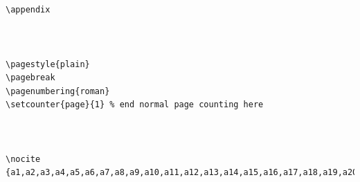 \documentclass[12pt]{report}
\begin{document}
\begin{verbatim}
	

\appendix

	

\pagestyle{plain}
\pagebreak
\pagenumbering{roman}
\setcounter{page}{1} % end normal page counting here



\nocite {a1,a2,a3,a4,a5,a6,a7,a8,a9,a10,a11,a12,a13,a14,a15,a16,a17,a18,a19,a20,a21}
	

	
\end{verbatim}
\end{document}
